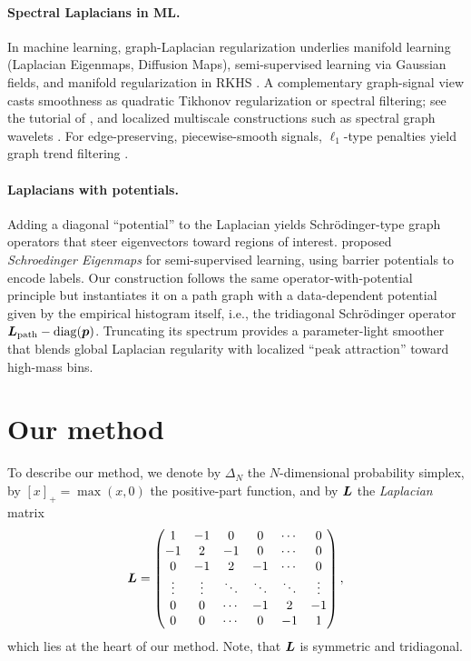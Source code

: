 \documentclass[10pt]{article} %
\DeclareMathOperator{\diag}{diag}
\begin{document}
\paragraph{Spectral Laplacians in ML.} In machine learning, graph-Laplacian regularization underlies manifold learning (Laplacian Eigenmaps, Diffusion Maps), semi-supervised learning via Gaussian fields, and manifold regularization in RKHS \citep{BelkinNiyogi2003,CoifmanLafon2006,ZhuGhahramaniLafferty2003,BelkinNiyogiSindhwani2006}. A complementary graph-signal view casts smoothness as quadratic Tikhonov regularization or spectral filtering; see the tutorial of \citet{Shuman2013SPMag}, and localized multiscale constructions such as spectral graph wavelets \citep{Hammond2011}. For edge-preserving, piecewise-smooth signals, $\ell_1$-type penalties yield graph trend filtering \citep{Wang2016GraphTrendFiltering}.

\paragraph{Laplacians with potentials.} Adding a diagonal ``potential'' to the Laplacian yields Schr\"odinger-type graph operators that steer eigenvectors toward regions of interest. \citet{CzajaEhler2013PAMI} proposed \emph{Schroedinger Eigenmaps} for semi-supervised learning, using barrier potentials to encode labels. Our construction follows the same operator-with-potential principle but instantiates it on a path graph with a data-dependent potential given by the empirical histogram itself, i.e., the tridiagonal Schr\"odinger operator $\mL_{\text{path}}-\diag(\vp)$. Truncating its spectrum provides a parameter-light smoother that blends global Laplacian regularity with localized ``peak attraction'' toward high-mass bins.

\section{Our method}\label{sec:method}
To describe our method, we denote by $\Delta_N$ the $N$-dimensional probability simplex, by $[x]_+ = \max(x, 0)$ the positive-part function, and by ${\bm{L}}$ the \emph{Laplacian} matrix
\begin{equation}\label{eq:laplacian}
{\bm{L}} =\begin{pmatrix}
    1 & -1 & 0 & 0 & \cdots & 0 \\
    -1 & 2 & -1 & 0 & \cdots & 0 \\
    0 & -1 & 2 & -1 & \cdots & 0 \\
    \vdots & \vdots & \ddots & \ddots & \ddots & \vdots \\
    0 & 0 & \cdots & -1 & 2 & -1 \\
    0 & 0 & \cdots & 0 & -1 & 1
    \end{pmatrix},
\end{equation}
which lies at the heart of our method. Note, that ${\bm{L}}$ is symmetric and tridiagonal.
\end{document}
